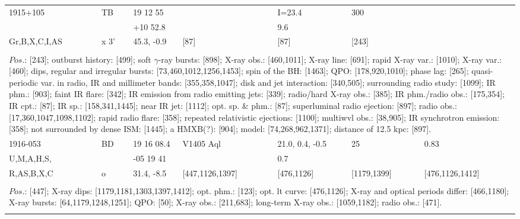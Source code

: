 \documentclass{aa}
\begin{document}
\begin{tabular}{p{2.5cm}p{1cm}p{1.8cm}p{2.3cm}p{3.3cm}p{2.0cm}p{2.2cm}}
\noalign{\smallskip}
1915+105              & TB            & 19 12 55                &                             & I=23.4                  & 300            &              \\
                                &                   & +10 52.8               &                              & 9.6                        &                    &                 \\
Gr,B,X,C,I,AS       & x 3'            & 45.3, -0.9              & [87]                     & [87]                       & [243]         &            \\
\\
\multicolumn{7}{p{17.5cm}}{
$Pos$.: [243]; outburst history: [499]; soft $\gamma$-ray bursts: [898]; X-ray obs.: [460,1011]; X-ray line: [691]; 
rapid X-ray var.: [1010]; X-ray var.: [460]; dips, regular and irregular bursts: [73,460,1012,1256,1453];
spin of the BH: [1463]; QPO: [178,920,1010]; phase lag: [265]; quasi-periodic var. in radio, IR and millimeter bands: 
[355,358,1047]; disk and jet interaction: [340,505]; surrounding 
radio study: [1099]; IR phm.: [903]; faint IR flare: [342]; IR emission from radio emitting jets: [339]; 
radio/hard X-ray obs.: [385]; IR phm./radio obs.: [175,354]; IR cpt.: [87]; IR sp.: [158,341,1445]; near IR jet: [1112]; 
opt. sp. \& phm.: [87]; superluminal radio ejection: [897]; radio obs.: [17,360,1047,1098,1102]; rapid radio flare: 
[358]; repeated relativistic ejections: [1100]; multiwvl obs.: [38,905]; IR synchrotron emission: [358]; not 
surrounded by dense ISM: [1445]; a HMXB(?): [904]; model: [74,268,962,1371]; distance of 12.5 kpc: [897].}\\
\noalign{\smallskip}
\hline

\noalign{\smallskip}
1916-053                      & BD         & 19 16 08.4          & V1405 Aql              & 21.0, 0.4, -0.5    & 25                      & 0.83       \\
U,M,A,H,S,                   &                & -05 19 41            &                                  & 0.7                       &                            &                \\
R,AS,B,X,C                  & o            & 31.4, -8.5             &  [447,1126,1397]   & [476,1126]          & [1179,1399]     & [476,1126,1412] \\
\\
\multicolumn{7}{p{17.5cm}}{
$Pos$.: [447]; X-ray dips: [1179,1181,1303,1397,1412]; opt. phm.: [123]; opt. lt curve: [476,1126]; X-ray and optical 
periods differ: [466,1180]; X-ray bursts: [64,1179,1248,1251]; QPO: [50]; X-ray obs.: [211,683]; long-term X-ray obs.: 
[1059,1182]; radio obs.: [471].}\\
\noalign{\smallskip}
\hline


\end{tabular}
\end{document}
